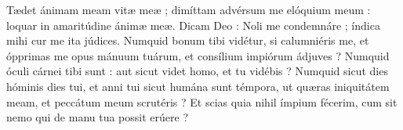 \lettrine{T}{}ædet ánimam meam vitæ meæ ; dimíttam advérsum me elóquium meum : loquar in amaritúdine ánimæ meæ.
Dicam Deo : Noli me condemnáre ; índica mihi cur me ita júdices.
Numquid bonum tibi vidétur, si calumniéris me, et ópprimas me opus mánuum tuárum, et consílium impiórum ádjuves ?
Numquid óculi cárnei tibi sunt : aut sicut videt homo, et tu vidébis ?
Numquid sicut dies hóminis dies tui, et anni tui sicut humána sunt témpora,
ut quæras iniquitátem meam, et peccátum meum scrutéris ?
Et scias quia nihil ímpium fécerim, cum sit nemo qui de manu tua possit erúere ?